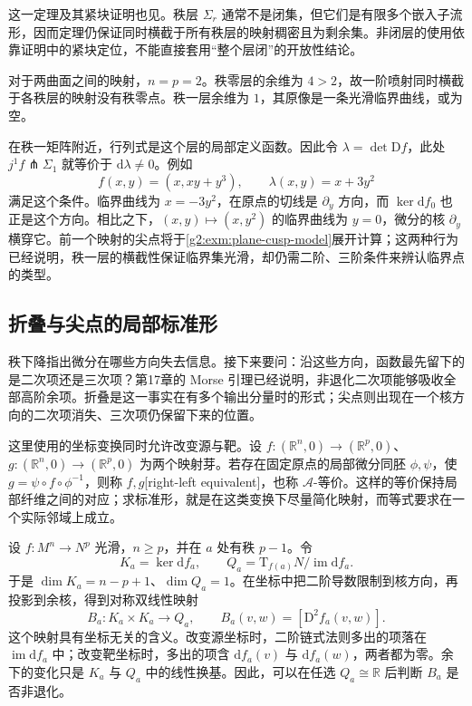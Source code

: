 这一定理及其紧块证明也见\cite[第II章第4节，定理4.9及推论4.10，第54—56页]{GolubitskyGuillemin1973}。秩层 \(\Sigma_r\) 通常不是闭集，但它们是有限多个嵌入子流形，因而定理仍保证同时横截于所有秩层的映射稠密且为剩余集。非闭层的使用依靠证明中的紧块定位，不能直接套用“整个层闭”的开放性结论。

\begin{example}\label{g2:exm:surface-jet-rank}
	对于两曲面之间的映射，\(n=p=2\)。秩零层的余维为 \(4>2\)，故一阶喷射同时横截于各秩层的映射没有秩零点。秩一层余维为 \(1\)，其原像是一条光滑临界曲线，或为空。

	在秩一矩阵附近，行列式是这个层的局部定义函数。因此令 \(\lambda=\det\mathrm Df\)，此处 \(j^1f\pitchfork\Sigma_1\) 就等价于 \(\mathrm d\lambda\ne0\)。例如
	\[
		f(x,y)=(x,xy+y^3),\qquad\lambda(x,y)=x+3y^2
	\]
	满足这个条件。临界曲线为 \(x=-3y^2\)，在原点的切线是 \(\partial_y\) 方向，而 \(\ker\mathrm d f_0\) 也正是这个方向。相比之下，\((x,y)\mapsto(x,y^2)\) 的临界曲线为 \(y=0\)，微分的核 \(\partial_y\) 横穿它。前一个映射的尖点将于\cref{g2:exm:plane-cusp-model}展开计算；这两种行为已经说明，秩一层的横截性保证临界集光滑，却仍需二阶、三阶条件来辨认临界点的类型。
\end{example}

\subsection{折叠与尖点的局部标准形}
\label{g2:subsec:D03:03}

秩下降指出微分在哪些方向失去信息。接下来要问：沿这些方向，函数最先留下的是二次项还是三次项？第17章的 Morse 引理已经说明，非退化二次项能够吸收全部高阶余项。折叠是这一事实在有多个输出分量时的形式；尖点则出现在一个核方向的二次项消失、三次项仍保留下来的位置。

\ProseParagraphBreak

这里使用的坐标变换同时允许改变源与靶。设 \(f:(\mathbb R^n,0)\to(\mathbb R^p,0)\)、\(g:(\mathbb R^n,0)\to(\mathbb R^p,0)\) 为两个映射芽。若存在固定原点的局部微分同胚 \(\phi,\psi\)，使 \(g=\psi\circ f\circ\phi^{-1}\)，则称 \(f,g\)[right-left equivalent]，也称 \(\mathcal A\)-等价。这样的等价保持局部纤维之间的对应；求标准形，就是在这类变换下尽量简化映射，而等式要求在一个实际邻域上成立。

\ProseParagraphBreak

设 \(f:M^n\to N^p\) 光滑，\(n\ge p\)，并在 \(a\) 处有秩 \(p-1\)。令
\[
	K_a=\ker\mathrm df_a,\qquad Q_a=\mathrm T_{f(a)}N/\operatorname{im}\mathrm df_a.
\]
于是 \(\dim K_a=n-p+1\)、\(\dim Q_a=1\)。在坐标中把二阶导数限制到核方向，再投影到余核，得到对称双线性映射
\begin{equation}\label{g2:eq:intrinsic-kernel-hessian}
	B_a:K_a\times K_a\longrightarrow Q_a,\qquad B_a(v,w)=[\mathrm D^2f_a(v,w)].
\end{equation}
这个映射具有坐标无关的含义。改变源坐标时，二阶链式法则多出的项落在 \(\operatorname{im}\mathrm df_a\) 中；改变靶坐标时，多出的项含 \(\mathrm df_a(v)\) 与 \(\mathrm df_a(w)\)，两者都为零。余下的变化只是 \(K_a\) 与 \(Q_a\) 中的线性换基。因此，可以在任选 \(Q_a\cong\mathbb R\) 后判断 \(B_a\) 是否非退化。

